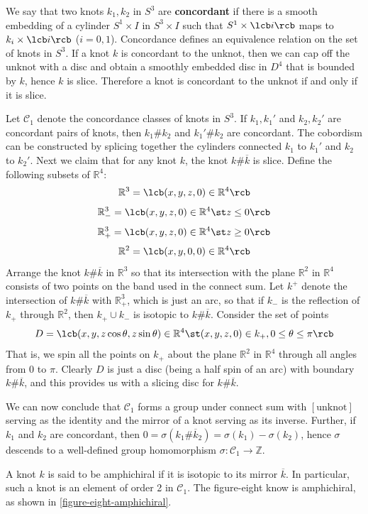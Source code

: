 We say that two knots $k_1,k_2$ in $S^3$ are \textbf{concordant} if there is a smooth embedding of a cylinder $S^1 \times I$ in $S^3 \times I$ such that $S^1 \times \lcb i \rcb$ maps to $k_i \times \lcb i \rcb$ ($i=0,1$). Concordance defines an equivalence relation on the set of knots in $S^3$. If a knot $k$ is concordant to the unknot, then we can cap off the unknot with a disc and obtain a smoothly embedded disc in $D^4$ that is bounded by $k$, hence $k$ is slice. Therefore a knot is concordant to the unknot if and only if it is slice.

Let $\mathcal C_1$ denote the concordance classes of knots in $S^3$. If $k_1,k_1'$ and $k_2,k_2'$ are concordant pairs of knots, then $k_1 \# k_2$ and $k_1' \# k_2$ are concordant. The cobordism can be constructed by splicing together the cylinders connected $k_1$ to $k_1'$ and $k_2$ to $k_2'$. Next we claim that for any knot $k$, the knot $k \# \overline k$ is slice. Define the following subsets of $\mathbb R^4$:
\[ \mathbb R^3 = \lcb (x,y,z,0) \in \mathbb R^4 \rcb \]
\[ \mathbb R_-^3 = \lcb (x,y,z,0) \in \mathbb R^4 \st z \leq 0 \rcb \]
\[ \mathbb R_+^3 = \lcb (x,y,z,0) \in \mathbb R^4 \st z \geq 0 \rcb \]
\[ \mathbb R^2 = \lcb (x,y,0,0) \in \mathbb R^4 \rcb \]
Arrange the knot $k \# \overline k$ in $\mathbb R^3$ so that its intersection with the plane $\mathbb R^2$ in $\mathbb R^4$ consists of two points on the band used in the connect sum. Let $k^+$ denote the intersection of $k \# \overline k$ with $\mathbb R_+^3$, which is just an arc, so that if $k_-$ is the reflection of $k_+$ through $\mathbb R^2$, then $k_+ \cup k_-$ is isotopic to $k \# \overline k$. Consider the set of points
\[ D = \lcb (x,y,z\cos\theta,z\sin\theta) \in \mathbb R^4 \st (x,y,z,0) \in k_+, 0 \leq \theta \leq \pi \rcb \]
That is, we spin all the points on $k_+$ about the plane $\mathbb R^2$ in $\mathbb R^4$ through all angles from $0$ to $\pi$. Clearly $D$ is just a disc (being a half spin of an arc) with boundary $k \# \overline k$, and this provides us with a slicing disc for $k \# \overline k$.

We can now conclude that $\mathcal C_1$ forms a group under connect sum with $[\text{unknot}]$ serving as the identity and the mirror of a knot serving as its inverse. Further, if $k_1$ and $k_2$ are concordant, then $0=\sigma(k_1 \# \overline k_2) = \sigma(k_1)-\sigma(k_2)$, hence $\sigma$ descends to a well-defined group homomorphism $\sigma : \mathcal C_1 \rightarrow \mathbb Z$.

A knot $k$ is said to be amphichiral if it is isotopic to its mirror $\overline k$. In particular, such a knot is an element of order 2 in $\mathcal C_1$. The figure-eight know is amphichiral, as shown in \cref{figure-eight-amphichiral}.

